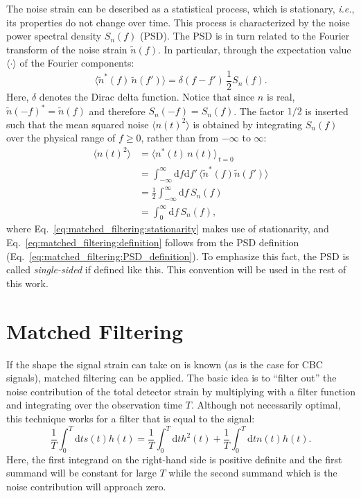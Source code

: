 The noise strain can be described as a statistical process, which is stationary, \emph{i.e.}, its properties do not change over time. This process is characterized by the noise power spectral density $S_n(f)$ (PSD). The PSD is in turn related to the Fourier transform of the noise strain $\tilde{n}(f)$. In particular, through the expectation value $\langle\cdot\rangle$ of the Fourier components:
\begin{equation}
	\label{eq:matched_filtering:PSD_definition}
	\langle\tilde{n}^*(f)\,\tilde{n}(f')\rangle 
	= \delta(f-f')\,\frac{1}{2}S_n(f).
\end{equation}	
Here, $\delta$ denotes the Dirac delta function. Notice that since $n$ is real, $\tilde{n}(-f)^* = \tilde{n}(f)$ and therefore $S_n(-f) = S_n(f)$. The factor $1/2$ is inserted such that the mean squared noise $\langle n(t)^2\rangle$ is obtained by integrating $S_n(f)$ over the physical range of $f\geq0$, rather than from $-\infty$ to $\infty$:
\begin{align}
	\label{eq:matched_filtering:stationarity}
	\langle n(t)^2\rangle &=
	\langle n^*(t)\,n(t)\rangle_{\,t=0} \\
	&= \int_{-\infty}^\infty\mathrm{d}f\mathrm{d}f'\,
	\langle\tilde{n}^*(f)\tilde{n}(f')\rangle \\
	\label{eq:matched_filtering:definition}
	&=  \frac{1}{2}\int_{-\infty}^\infty\mathrm{d}f\,S_n(f) \\
	&= \int_0^\infty\mathrm{d}f\,S_n(f),
\end{align}
where Eq.~\ref{eq:matched_filtering:stationarity} makes use of stationarity, and Eq.~\ref{eq:matched_filtering:definition} follows from the PSD definition (Eq.~\ref{eq:matched_filtering:PSD_definition}). To emphasize this fact, the PSD is called \emph{single-sided} if defined like this. This convention will be used in the rest of this work.

\section{Matched Filtering}

If the shape the signal strain can take on is known (as is the case for CBC signals), matched filtering can be applied. The basic idea is to \enquote{filter out} the noise contribution of the total detector strain by multiplying with a filter function and integrating over the observation time $T$. Although not necessarily optimal, this technique works for a filter that is equal to the signal:
\begin{equation}
	\frac{1}{T}\int_0^T \mathrm{d}t s(t)h(t) = \frac{1}{T}\int_0^T \mathrm{d}t h^2(t) + \frac{1}{T}\int_0^T \mathrm{d}t n(t)h(t).
\end{equation}
Here, the first integrand on the right-hand side is positive definite and the first summand will be constant for large $T$ while the second summand which is the noise contribution will approach zero.

